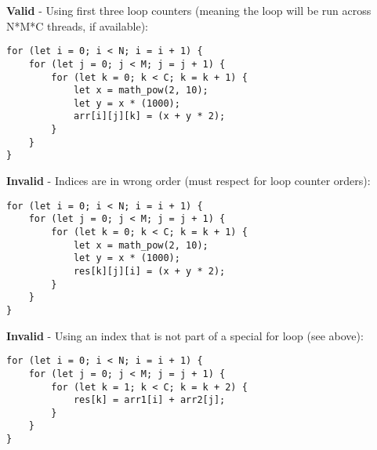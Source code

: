\textbf{Valid} - Using first three loop counters (meaning the loop will be run across N*M*C threads, if available):
\begin{verbatim}
for (let i = 0; i < N; i = i + 1) {
    for (let j = 0; j < M; j = j + 1) {
        for (let k = 0; k < C; k = k + 1) {
            let x = math_pow(2, 10);
            let y = x * (1000);
            arr[i][j][k] = (x + y * 2);
        }
    }
}
\end{verbatim}

\textbf{Invalid} - Indices are in wrong order (must respect for loop counter orders):
\begin{verbatim}
for (let i = 0; i < N; i = i + 1) {
    for (let j = 0; j < M; j = j + 1) {
        for (let k = 0; k < C; k = k + 1) {
            let x = math_pow(2, 10);
            let y = x * (1000);
            res[k][j][i] = (x + y * 2);
        }
    }
}
\end{verbatim}

\textbf{Invalid} - Using an index that is not part of a special for loop (see above):
\begin{verbatim}
for (let i = 0; i < N; i = i + 1) {
    for (let j = 0; j < M; j = j + 1) {
        for (let k = 1; k < C; k = k + 2) {
            res[k] = arr1[i] + arr2[j];
        }
    }
}
\end{verbatim}

\newpage



\newpage





